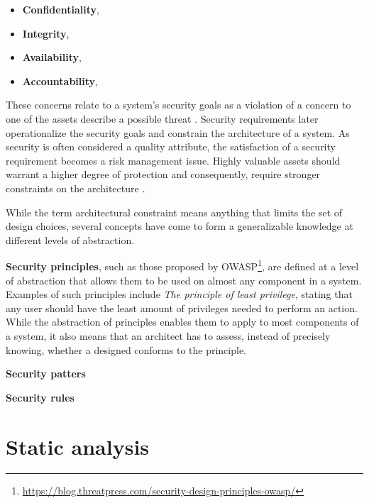 \begin{itemize}
    \item \textbf{Confidentiality},  \cite{ross_systems_2018}
    \item \textbf{Integrity},  \cite{ross_systems_2018}
    \item \textbf{Availability},  \cite{ross_systems_2018}
    \item \textbf{Accountability},  \cite{ross_systems_2018}
\end{itemize}

These concerns relate to a system's security goals as a violation of a concern to one of the assets describe a possible threat \cite{haley_security_2008}. Security requirements later operationalize the security goals and constrain the architecture of a system. As security is often considered a quality attribute, the satisfaction of a security requirement becomes a risk management issue.  Highly valuable assets should warrant a higher degree of protection and consequently, require stronger constraints on the architecture \cite{broy_software_2007}.

While the term architectural constraint means anything that limits the set of design choices, several concepts have come to form a generalizable knowledge at different levels of abstraction. 

\textbf{Security principles}, such as those proposed by OWASP\footnote{\url{https://blog.threatpress.com/security-design-principles-owasp/}}, are defined at a level of abstraction that allows them to be used on almost any component in a system. Examples of such principles include \textit{The principle of least privilege}, stating that any user should have the least amount of privileges needed to perform an action. While the abstraction of principles enables them to apply to most components of a system, it also means that an architect has to assess, instead of precisely knowing, whether a designed conforms to the principle. 

\textbf{Security patters}

\textbf{Security rules}

\section{Static analysis}
\cite{chess_secure_2007}

